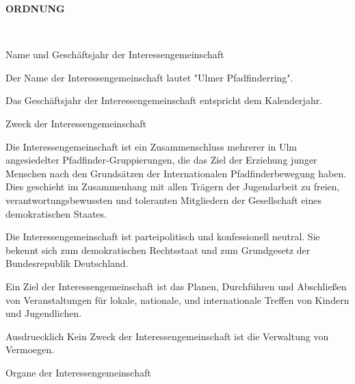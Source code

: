 \begin{Large}
    \textbf{ORDNUNG}
\end{Large}
\\



\begin{legal}
    \item Name und Geschäftsjahr der Interessengemeinschaft
        \begin{legal}
            \item Der Name der Interessengemeinschaft lautet "Ulmer Pfadfinderring".
            \item Das Geschäftsjahr der Interessengemeinschaft entspricht dem Kalenderjahr.
        \end{legal}
    \item Zweck der Interessengemeinschaft
        \begin{legal}
            \item Die Interessengemeinschaft ist ein Zusammenschluss mehrerer in Ulm angesiedelter
                  Pfadfinder-Gruppierungen, die das Ziel der Erziehung junger Menschen nach den 
                  Grundsätzen der Internationalen Pfadfinderbewegung haben. Dies geschieht im Zusammenhang 
                  mit allen Trägern der Jugendarbeit zu freien, verantwortungsbewussten und 
                  toleranten Mitgliedern der Gesellschaft eines demokratischen Staates.
            \item Die Interessengemeinschaft ist parteipolitisch und konfessionell neutral. 
                  Sie bekennt sich zum demokratischen Rechtsstaat und zum Grundgesetz der 
                  Bundesrepublik Deutschland.
            \item Ein Ziel der Interessengemeinschaft ist das Planen, Durchführen und Abschließen 
                  von Veranstaltungen für lokale, nationale, und internationale Treffen von 
                  Kindern und Jugendlichen.
            \item Ausdruecklich Kein Zweck der Interessengemeinschaft ist die Verwaltung von        
                  Vermoegen.
        \end{legal}
    \item Organe der Interessengemeinschaft

\end{legal}
